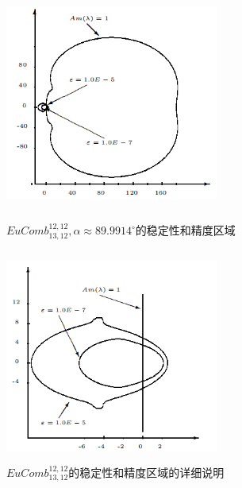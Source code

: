\documentclass[12pt,a4paper]{article}
\begin{document}
\begin{figure}[H]
	{
		\begin{minipage}{6cm}
			\centering
			\includegraphics[width=7cm,height=7cm]{./figures/15.png}
			\caption{$EuComb_{13,12}^{12,12}, \alpha \approx 89.9914^{\circ}$的稳定性和精度区域}
			\label{5.15}
		\end{minipage}
	}
	{
		\begin{minipage}{6cm}
			\centering
			\includegraphics[width=7cm,height=7cm]{./figures/16.png}
			\caption{$EuComb_{13,12}^{12,12}$的稳定性和精度区域的详细说明}
			\label{5.16}
		\end{minipage}
	}
\end{figure}
\end{document}
